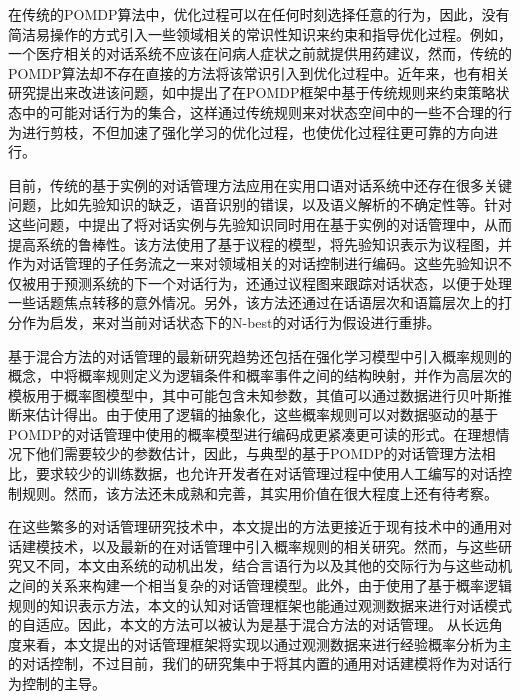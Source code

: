\begin{enumerate}
在传统的POMDP算法中，优化过程可以在任何时刻选择任意的行为，因此，没有简洁易操作的方式引入一些领域相关的常识性知识来约束和指导优化过程。例如，一个医疗相关的对话系统不应该在问病人症状之前就提供用药建议，然而，传统的POMDP算法却不存在直接的方法将该常识引入到优化过程中。近年来，也有相关研究提出来改进该问题，如\cite{Lemmon2006, Williams2008b}中提出了在POMDP框架中基于传统规则来约束策略状态中的可能对话行为的集合，这样通过传统规则来对状态空间中的一些不合理的行为进行剪枝，不但加速了强化学习的优化过程，也使优化过程往更可靠的方向进行。

目前，传统的基于实例的对话管理方法应用在实用口语对话系统中还存在很多关键问题，比如先验知识的缺乏，语音识别的错误，以及语义解析的不确定性等。针对这些问题，\cite{Lee2009b}中提出了将对话实例与先验知识同时用在基于实例的对话管理中，从而提高系统的鲁棒性。该方法使用了基于议程的模型，将先验知识表示为议程图，并作为对话管理的子任务流之一来对领域相关的对话控制进行编码。这些先验知识不仅被用于预测系统的下一个对话行为，还通过议程图来跟踪对话状态，以便于处理一些话题焦点转移的意外情况。另外，该方法还通过在话语层次和语篇层次上的打分作为启发，来对当前对话状态下的N-best的对话行为假设进行重排。

基于混合方法的对话管理的最新研究趋势还包括在强化学习模型中引入概率规则的概念，\cite{Lison2015}中将概率规则定义为逻辑条件和概率事件之间的结构映射，并作为高层次的模板用于概率图模型中，其中可能包含未知参数，其值可以通过数据进行贝叶斯推断来估计得出。由于使用了逻辑的抽象化，这些概率规则可以对数据驱动的基于POMDP的对话管理中使用的概率模型进行编码成更紧凑更可读的形式。在理想情况下他们需要较少的参数估计，因此，与典型的基于POMDP的对话管理方法相比，要求较少的训练数据，也允许开发者在对话管理过程中使用人工编写的对话控制规则。然而，该方法还未成熟和完善，其实用价值在很大程度上还有待考察。

\end{enumerate}

在这些繁多的对话管理研究技术中，本文提出的方法更接近于现有技术中的通用对话建模技术，以及最新的在对话管理中引入概率规则的相关研究。然而，与这些研究又不同，本文由系统的动机出发，结合言语行为以及其他的交际行为与这些动机之间的关系来构建一个相当复杂的对话管理模型。此外，由于使用了基于概率逻辑规则的知识表示方法，本文的认知对话管理框架也能通过观测数据来进行对话模式的自适应。因此，本文的方法可以被认为是基于混合方法的对话管理。
从长远角度来看，本文提出的对话管理框架将实现以通过观测数据来进行经验概率分析为主的对话控制，不过目前，我们的研究集中于将其内置的通用对话建模将作为对话行为控制的主导。


